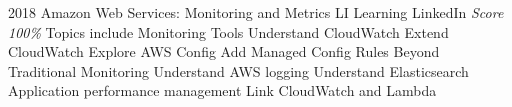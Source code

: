 \documentclass[11pt,a4paper]{moderncv}
\begin{document}
\cventry
    {2018}
    {Amazon Web Services: Monitoring and Metrics}
    {LI Learning}
    {LinkedIn}
    {\textit{Score 100\%}}
    {
        Topics include                                                                                            %
            Monitoring Tools                                                                                      %
            Understand CloudWatch                                                                                 %
            Extend CloudWatch                                                                                     %
            Explore AWS Config                                                                                    %
            Add Managed Config Rules                                                                              %
            Beyond Traditional Monitoring                                                                         %
            Understand AWS logging                                                                                %
            Understand Elasticsearch                                                                              %
            Application performance management                                                                    %
            Link CloudWatch and Lambda                                                                            %
    }
\end{document}
